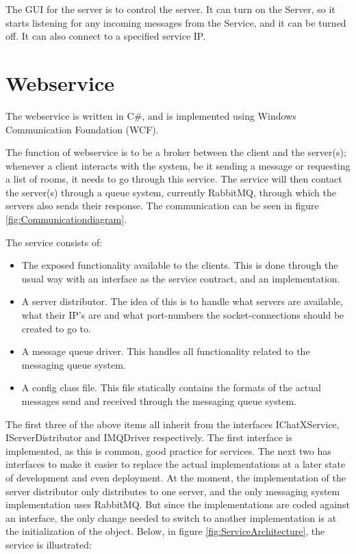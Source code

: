The GUI for the server is to control the server. It can turn on the Server, so it starts listening for any incoming messages from the Service, and it can be turned off. It can also connect to a specified service IP.


\section{Webservice}
The webservice is written in C\#, and is implemented using Windows Communication Foundation (WCF). 

The function of webservice is to be a broker between the client and the server(s); whenever a client interacts with the system, be it sending a message or requesting a list of rooms, it needs to go through this service. The service will then  contact the server(s) through a queue system, currently RabbitMQ, through which the servers also sends their response. The communication can be seen in figure \ref{fig:Communicationdiagram}.

The service consists of:
\begin{itemize}
 \item The exposed functionality available to the clients. This is done through the usual way with an interface as the service contract, and an implementation.

 \item A server distributor. The idea of this is to handle what servers are available, what their IP's are and what port-numbers the socket-connections should be created to go to. 
 
 \item A message queue driver. This handles all functionality related to the messaging queue system.
 
 \item A config class file. This file statically contains the formats of the actual messages send and received through the messaging queue system.

\end{itemize}

The first three of the above items all inherit from the interfaces IChatXService, IServerDistributor and IMQDriver respectively. The first interface is implemented, as this is common, good practice for services. The next two has interfaces to make it easier to replace the actual implementations at a later state of development and even deployment. At the moment, the implementation of the server distributor only distributes to one server, and the only messaging system implementation uses RabbitMQ. But since the implementations are coded against an interface, the only change needed to switch to another implementation is at the initialization of the object.
Below, in figure \ref{fig:ServiceArchitecture}, the service is illustrated:

